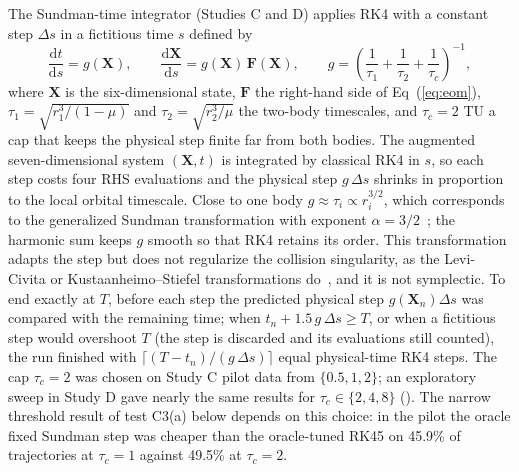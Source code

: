 \documentclass[10pt,letterpaper]{article}
\newcommand{\dd}{\mathrm{d}}
\begin{document}
The Sundman-time integrator (Studies C and D) applies RK4 with a constant step $\Delta s$ in a fictitious time $s$ defined by
\begin{equation}
\label{eq:sundman}
\frac{\dd t}{\dd s} = g(\boldsymbol{X}), \qquad
\frac{\dd \boldsymbol{X}}{\dd s} = g(\boldsymbol{X})\,\boldsymbol{F}(\boldsymbol{X}), \qquad
g = \left(\frac{1}{\tau_{1}} + \frac{1}{\tau_{2}} + \frac{1}{\tau_{c}}\right)^{-1},
\end{equation}
where $\boldsymbol{X}$ is the six-dimensional state, $\boldsymbol{F}$ the right-hand side of Eq~(\ref{eq:eom}), $\tau_{1} = \sqrt{r_{1}^{3}/(1-\mu)}$ and $\tau_{2} = \sqrt{r_{2}^{3}/\mu}$ the two-body timescales, and $\tau_{c} = 2$ TU a cap that keeps the physical step finite far from both bodies. The augmented seven-dimensional system $(\boldsymbol{X}, t)$ is integrated by classical RK4 in $s$, so each step costs four RHS evaluations and the physical step $g\,\Delta s$ shrinks in proportion to the local orbital timescale. Close to one body $g \approx \tau_{i} \propto r_{i}^{3/2}$, which corresponds to the generalized Sundman transformation with exponent $\alpha = 3/2$~\cite{berry2002}; the harmonic sum keeps $g$ smooth so that RK4 retains its order. This transformation adapts the step but does not regularize the collision singularity, as the Levi-Civita or Kustaanheimo--Stiefel transformations do~\cite{levicivita1920,kustaanheimo1965}, and it is not symplectic. To end exactly at $T$, before each step the predicted physical step $g(\boldsymbol{X}_{n})\Delta s$ was compared with the remaining time; when $t_{n} + 1.5\,g\,\Delta s \ge T$, or when a fictitious step would overshoot $T$ (the step is discarded and its evaluations still counted), the run finished with $\lceil (T-t_{n})/(g\,\Delta s) \rceil$ equal physical-time RK4 steps. The cap $\tau_{c} = 2$ was chosen on Study C pilot data from $\{0.5, 1, 2\}$; an exploratory sweep in Study D gave nearly the same results for $\tau_{c} \in \{2,4,8\}$ (). The narrow threshold result of test C3(a) below depends on this choice: in the pilot the oracle fixed Sundman step was cheaper than the oracle-tuned RK45 on 45.9\% of trajectories at $\tau_{c} = 1$ against 49.5\% at $\tau_{c} = 2$.
\end{document}
